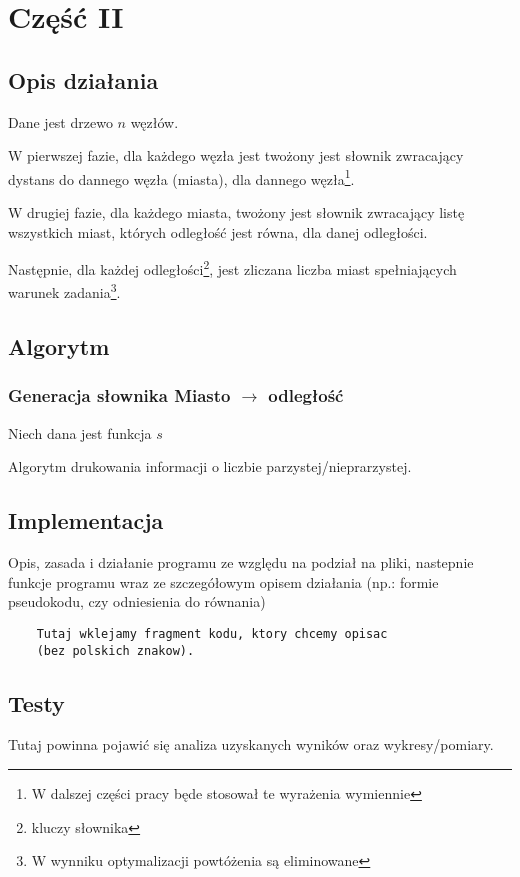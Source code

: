 \documentclass[12pt,a4paper]{article}
\begin{document}
	\newpage
	\section*{Część II}
	\subsection*{Opis działania} 
	
    Dane jest drzewo $n$ węzłów.

    W pierwszej fazie, dla każdego węzła jest twożony jest słownik zwracający
    dystans do dannego węzła (miasta), dla dannego węzła\footnote{W dalszej
    części pracy będe stosował te wyrażenia wymiennie}.

    W drugiej fazie, dla każdego miasta, twożony jest słownik zwracający listę
    wszystkich miast, których odległość jest równa, dla danej odległości.

    Następnie, dla każdej odległości\footnote{kluczy słownika}, jest zliczana
    liczba miast spełniających warunek zadania\footnote{W wynniku optymalizacji
    powtóżenia są eliminowane}.
	
	\subsection*{Algorytm}
    
    \subsubsection*{Generacja słownika Miasto $\rightarrow$ odległość}
    
    Niech dana jest funkcja $s$

	\begin{algorithm}[H]
		\caption{Algorytm drukowania informacji o liczbie parzystej/nieprarzystej.}
	\end{algorithm}

	\subsection*{Implementacja}
	Opis, zasada i działanie programu ze względu na podział na pliki, nastepnie	funkcje programu wraz ze szczegółowym opisem działania (np.: formie pseudokodu, czy odniesienia do równania)
	\begin{lstlisting}
	Tutaj wklejamy fragment kodu, ktory chcemy opisac 
	(bez polskich znakow).
	\end{lstlisting}
	\subsection*{Testy}
	Tutaj powinna pojawić się analiza uzyskanych wyników oraz wykresy/pomiary.
	
\end{document}
